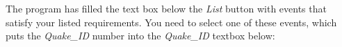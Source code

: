 \documentclass{manual}
\begin{document}
\begin{figure}[ht]
  \centerline{}
  \label{fig:event3}
\end{figure}

\pagebreak

The program has filled the text box below the \emph{List} button with events that satisfy
your listed requirements.  You need to select one of these events, which puts the \emph{Quake_ID}
number into the \emph{Quake_ID} textbox below:
\end{document}
